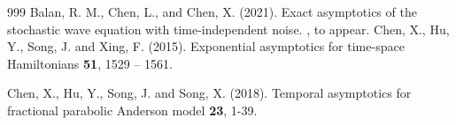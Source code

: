 \documentclass[a4paper,11pt]{article}
\numberwithin{equation}{section}
\theoremstyle{plain}
\theoremstyle{definition}
\numberwithin{NQ}{section}
\numberwithin{LQ}{section}
\numberwithin{ZQ}{section}
\begin{document}
\begin{thebibliography}{999}
	Balan, R. M., Chen, L., and Chen, X. (2021).
	\newblock Exact asymptotics of the stochastic wave equation with time-independent noise.
	, to appear.
	Chen, X., Hu, Y., Song, J. and Xing, F. (2015).
	\newblock Exponential asymptotics for time-space Hamiltonians
	 \textbf{51}, 1529 -- 1561.

	Chen, X., Hu, Y., Song, J. and Song, X. (2018).
	\newblock Temporal asymptotics for fractional parabolic Anderson model
	 \textbf{23}, 1-39.


\end{thebibliography}
\end{document}
